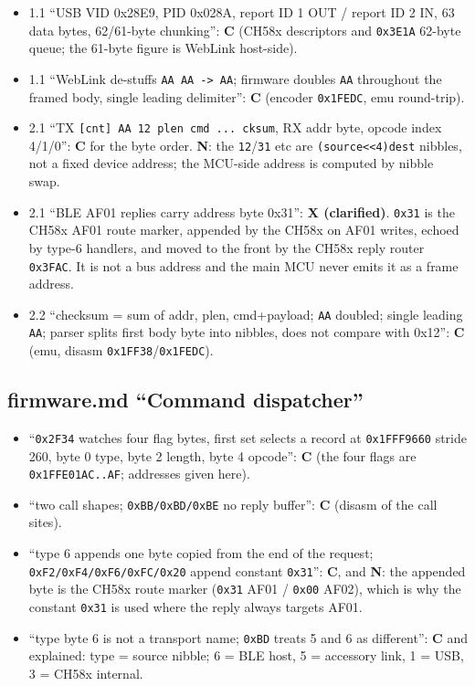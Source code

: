 \begin{itemize}
\tightlist
\item
  1.1 ``USB VID 0x28E9, PID 0x028A, report ID 1 OUT / report ID 2 IN, 63
  data bytes, 62/61-byte chunking'': \textbf{C} (CH58x descriptors and
  \texttt{0x3E1A} 62-byte queue; the 61-byte figure is WebLink
  host-side).
\item
  1.1 ``WebLink de-stuffs \texttt{AA\ AA\ -\textgreater{}\ AA}; firmware
  doubles \texttt{AA} throughout the framed body, single leading
  delimiter'': \textbf{C} (encoder \texttt{0x1FEDC}, emu round-trip).
\item
  2.1 ``TX \texttt{{[}cnt{]}\ AA\ 12\ plen\ cmd\ ...\ cksum}, RX addr
  byte, opcode index 4/1/0'': \textbf{C} for the byte order. \textbf{N}:
  the \texttt{12}/\texttt{31} etc are
  \texttt{(source\textless{}\textless{}4)\textbar{}dest} nibbles, not a
  fixed device address; the MCU-side address is computed by nibble swap.
\item
  2.1 ``BLE AF01 replies carry address byte 0x31'': \textbf{X
  (clarified)}. \texttt{0x31} is the CH58x AF01 route marker, appended
  by the CH58x on AF01 writes, echoed by type-6 handlers, and moved to
  the front by the CH58x reply router \texttt{0x3FAC}. It is not a bus
  address and the main MCU never emits it as a frame address.
\item
  2.2 ``checksum = sum of addr, plen, cmd+payload; \texttt{AA} doubled;
  single leading \texttt{AA}; parser splits first body byte into
  nibbles, does not compare with 0x12'': \textbf{C} (emu, disasm
  \texttt{0x1FF38}/\texttt{0x1FEDC}).
\end{itemize}

\subsection{firmware.md ``Command
dispatcher''}\label{firmware.md-command-dispatcher-1}

\begin{itemize}
\tightlist
\item
  ``\texttt{0x2F34} watches four flag bytes, first set selects a record
  at \texttt{0x1FFF9660} stride 260, byte 0 type, byte 2 length, byte 4
  opcode'': \textbf{C} (the four flags are \texttt{0x1FFE01AC..AF};
  addresses given here).
\item
  ``two call shapes; \texttt{0xBB/\allowbreak{}0xBD/\allowbreak{}0xBE} no reply buffer'':
  \textbf{C} (disasm of the call sites).
\item
  ``type 6 appends one byte copied from the end of the request;
  \texttt{0xF2/\allowbreak{}0xF4/\allowbreak{}0xF6/\allowbreak{}0xFC/\allowbreak{}0x20} append constant \texttt{0x31}'':
  \textbf{C}, and \textbf{N}: the appended byte is the CH58x route
  marker (\texttt{0x31} AF01 / \texttt{0x00} AF02), which is why the
  constant \texttt{0x31} is used where the reply always targets AF01.
\item
  ``type byte 6 is not a transport name; \texttt{0xBD} treats 5 and 6 as
  different'': \textbf{C} and explained: type = source nibble; 6 = BLE
  host, 5 = accessory link, 1 = USB, 3 = CH58x internal.
\end{itemize}

